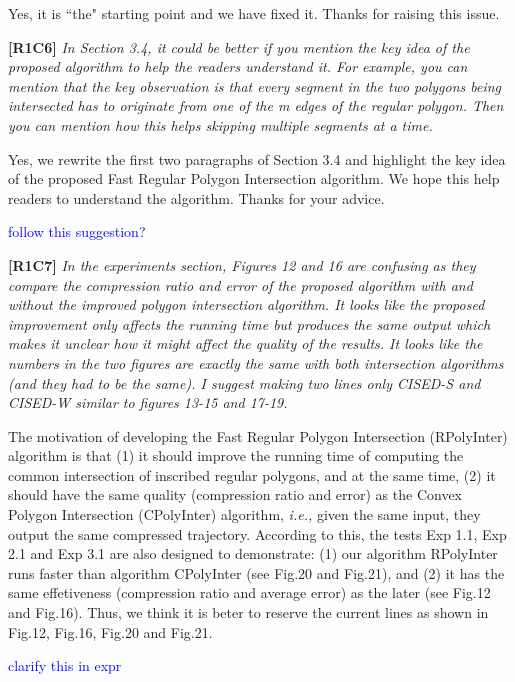 \documentclass{letter}
\newcommand{\ie}{\emph{i.e.,}\xspace}
\begin{document}
Yes, it is ``the" starting point and we have fixed it. Thanks for raising this issue.

\textbf{[R1C6]} \emph{In Section 3.4, it could be better if you mention the key idea of the proposed algorithm to help the readers understand it. For example, you can mention that the key observation is that every segment in the two polygons being intersected has to originate from one of the m edges of the regular polygon. Then you can mention how this helps skipping multiple segments at a time.}

Yes, we rewrite the first two paragraphs of Section 3.4 and highlight the key idea of the proposed Fast Regular Polygon Intersection algorithm. We hope this help readers to understand the algorithm. 
Thanks for your advice.

\textcolor{blue}{follow this suggestion?}

\textbf{[R1C7]} \emph{In the experiments section, Figures 12 and 16 are confusing as they compare the compression ratio and error of the proposed algorithm with and without the improved polygon intersection algorithm. It looks like the proposed improvement only affects the running time but produces the same output which makes it unclear how it might affect the quality of the results. It looks like the numbers in the two figures are exactly the same with both intersection algorithms (and they had to be the same). I suggest making two lines only CISED-S and CISED-W similar to figures 13-15 and 17-19.}

The motivation of developing the Fast Regular Polygon Intersection (RPolyInter) algorithm is that (1) it should improve the running time of computing the common intersection of inscribed regular polygons, and at the same time, (2) it should have the same quality (compression ratio and error) as the Convex Polygon Intersection (CPolyInter) algorithm, \ie  given the same input, they output the same compressed trajectory.
According to this, the tests Exp 1.1, Exp 2.1 and Exp 3.1 are also designed to demonstrate: (1) our algorithm RPolyInter runs faster than algorithm CPolyInter (see Fig.20 and Fig.21), and (2) it has the same effetiveness (compression ratio and average error) as the later (see Fig.12 and Fig.16). 
%
Thus, we think it is beter to reserve the current lines as shown in Fig.12, Fig.16, Fig.20 and Fig.21. %

\textcolor{blue}{clarify this in expr}
\end{document}
